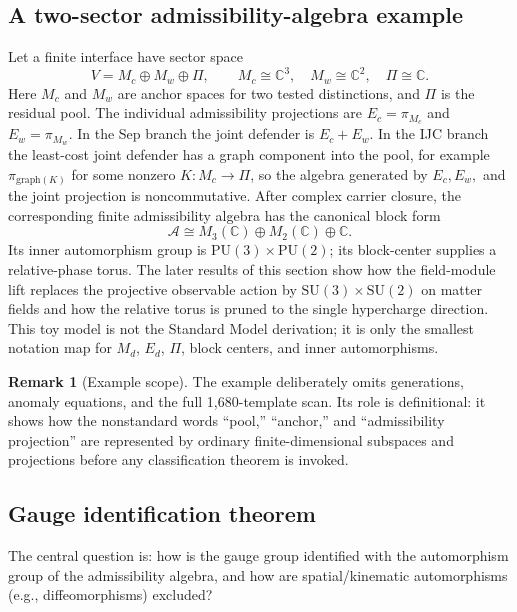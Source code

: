 \documentclass[11pt]{article}
\theoremstyle{definition}
\newtheorem{remark}[theorem]{Remark}
\newcommand{\SU}{\mathrm{SU}}
\begin{document}
\subsection{A two-sector admissibility-algebra example}
\label{sec:two_sector_example}

\begin{tcolorbox}[apfbox, title={Worked example: pool, anchors, projections}]
\footnotesize
Let a finite interface have sector space
\[
  V=M_c\oplus M_w\oplus \Pi,
  \qquad
  M_c\cong\mathbb C^3,
  \quad M_w\cong\mathbb C^2,
  \quad \Pi\cong\mathbb C .
\]
Here $M_c$ and $M_w$ are anchor spaces for two tested distinctions, and
$\Pi$ is the residual pool.  The individual admissibility projections are
$E_c=\pi_{M_c}$ and $E_w=\pi_{M_w}$.  In the Sep branch the joint
defender is $E_c+E_w$.  In the IJC branch the least-cost joint defender
has a graph component into the pool, for example
$\pi_{\mathrm{graph}(K)}$ for some nonzero $K:M_c\to\Pi$, so the algebra
generated by $E_c,E_w,$ and the joint projection is noncommutative.
After complex carrier closure, the corresponding finite admissibility
algebra has the canonical block form
\[
  \mathcal A\cong M_3(\mathbb C)\oplus M_2(\mathbb C)\oplus\mathbb C .
\]
Its inner automorphism group is $\mathrm{PU}(3)\times\mathrm{PU}(2)$;
its block-center supplies a relative-phase torus.  The later results of
this section show how the field-module lift replaces the projective
observable action by $\SU(3)\times\SU(2)$ on matter fields and how the
relative torus is pruned to the single hypercharge direction.  This toy
model is not the Standard Model derivation; it is only the smallest
notation map for $M_d$, $E_d$, $\Pi$, block centers, and inner
automorphisms.
\end{tcolorbox}
\begin{remark}[Example scope]\label{ex:two_sector_admissibility}
The example deliberately omits generations, anomaly equations, and the
full 1{,}680-template scan.  Its role is definitional: it shows how the
nonstandard words ``pool,'' ``anchor,'' and ``admissibility projection'' are
represented by ordinary finite-dimensional subspaces and projections before
any classification theorem is invoked.
\end{remark}

\subsection{Gauge identification theorem}
\label{sec:gauge_ident}

The central question is: how is the gauge group identified with the
automorphism group of the admissibility algebra, and how are
spatial/kinematic automorphisms (e.g., diffeomorphisms) excluded?
\end{document}

